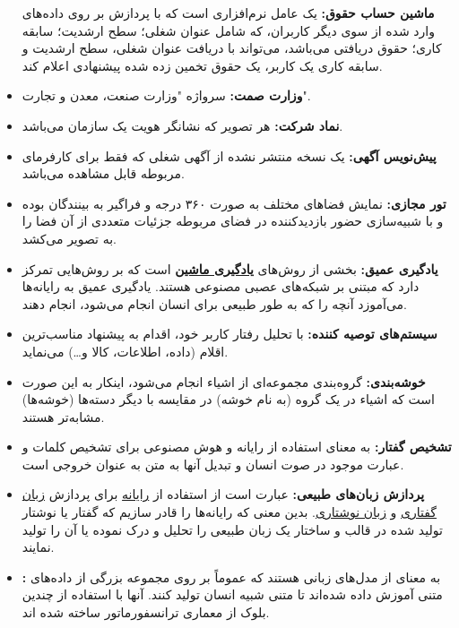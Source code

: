 \documentclass[12pt]{article}
\begin{document}
\begin{itemize}
		\textbf{ماشین حساب حقوق:}
		یک عامل نرم‌افزاری است که با پردازش بر روی داده‌های وارد شده از سوی دیگر کاربران، که شامل عنوان شغلی؛ سطح ارشدیت؛ سابقه کاری؛ حقوق دریافتی می‌باشد، می‌تواند با دریافت عنوان شغلی، سطح ارشدیت و سابقه کاری یک کاربر، یک حقوق تخمین زده شده پیشنهادی اعلام کند.
		\item
		\textbf{وزارت صمت:}
		سرواژه "وزارت صنعت، معدن و تجارت".
		\item
		\textbf{نماد شرکت:}
		هر تصویر که نشانگر هویت یک سازمان می‌باشد.
		\item
		\textbf{پیش‌نویس آگهی:}
		یک نسخه منتشر نشده از آگهی شغلی که فقط برای کارفرمای مربوطه قابل مشاهده می‌باشد.
		\item
		\textbf{تور مجازی:‌}
		نمایش فضاهای مختلف به صورت ۳۶۰ درجه و فراگیر به بینندگان بوده و با شبیه‌سازی حضور بازدیدکننده در فضای مربوطه جزئیات متعددی از آن فضا را به تصویر می‌کشد.
		\item
		\textbf{یادگیری عمیق:}
		بخشی از روش‌های \textbf{\hyperref[ref:ml]{یادگیری ماشین}} است که بر روش‌هایی تمرکز دارد که مبتنی بر شبکه‌های عصبی مصنوعی هستند. یادگیری عمیق به رایانه‌ها می‌آموزد آنچه را که به طور طبیعی برای انسان انجام می‌شود، انجام دهند.
		\item
		\textbf{سیستم‌های توصیه کننده:}
		با تحلیل رفتار کاربر خود، اقدام به پیشنهاد مناسب‌ترین اقلام (داده، اطلاعات، کالا و…) می‌نماید.
		\item
		\textbf{خوشه‌بندی:}
		گروه‌بندی مجموعه‌ای از اشیاء انجام می‌شود، اینکار به این صورت است که اشیاء در یک گروه (به نام خوشه) در مقایسه با دیگر دسته‌ها (خوشه‌ها) مشابه‌تر هستند.
		\item
		\textbf{تشخیص گفتار:}
		به معنای استفاده از رایانه و هوش مصنوعی برای تشخیص کلمات و عبارت موجود در صوت انسان و تبدیل آنها به متن به عنوان خروجی است.
		\item
		\textbf{پردازش زبان‌های طبیعی:}
		عبارت است از استفاده از
		\href{https://fa.wikipedia.org/wiki/%D8%B1%D8%A7%DB%8C%D8%A7%D9%86%D9%87}{رایانه}
		برای پردازش
		\href{https://fa.wikipedia.org/wiki/%D8%B2%D8%A8%D8%A7%D9%86_%DA%AF%D9%81%D8%AA%D8%A7%D8%B1%DB%8C}{زبان گفتاری}
		و
		\href{https://fa.wikipedia.org/wiki/%D8%B2%D8%A8%D8%A7%D9%86_%D9%86%D9%88%D8%B4%D8%AA%D8%A7%D8%B1%DB%8C}{زبان نوشتاری}. بدین معنی که رایانه‌ها را قادر سازیم که گفتار یا نوشتار تولید شده در قالب و ساختار یک زبان طبیعی را تحلیل و درک نموده یا آن را تولید نمایند.
		\item
		\textbf{:}
		به معنای
		از مدل‌های زبانی هستند که عموماً بر روی مجموعه بزرگی از داده‌های متنی آموزش داده شده‌اند تا متنی شبیه انسان تولید کنند. آنها با استفاده از چندین بلوک از معماری ترانسفورماتور ساخته شده اند.
	\end{itemize}
\end{document}
